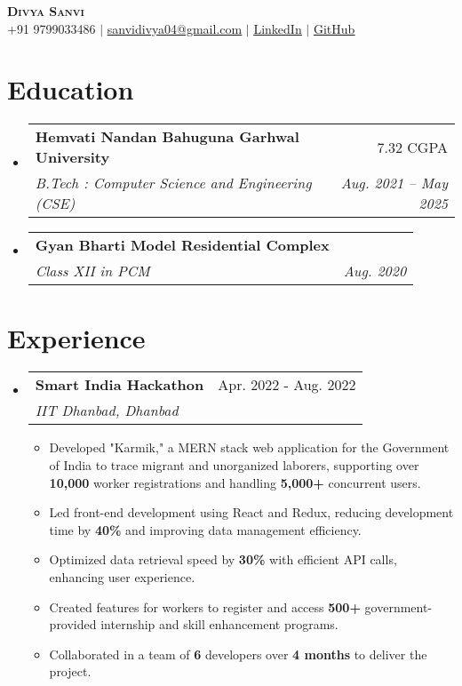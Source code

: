 \documentclass[letterpaper,10pt]{article}
\makeatletter
\newcommand{\resumeItem}[1]{\item\small{#1 \vspace{-2pt}}}
\newcommand{\resumeSubheading}[4]{\vspace{-2pt}\item\begin{tabular*}{0.98\textwidth}[t]{l@{\extracolsep{\fill}}r}\textbf{#1} & #2 \\ \textit{\small#3} & \textit{\small #4} \\ \end{tabular*}\vspace{-5pt}}
\newcommand{\resumeSubHeadingListStart}{\begin{itemize}[leftmargin=0.1in, label={}]}
\newcommand{\resumeSubHeadingListEnd}{\end{itemize}}
\newcommand{\resumeItemListStart}{\begin{itemize}}
\newcommand{\resumeItemListEnd}{\end{itemize}\vspace{-5pt}}
\makeatother
\begin{document}
\begin{center}
    {\Huge \scshape \textbf{Divya Sanvi}} \\ \vspace{4pt}
    \small +91 9799033486 $|$ \href{mailto:sanvidivya04@gmail.com}{\underline{sanvidivya04@gmail.com}} $|$ 
    \href{https://linkedin.com/in/divya-sanvi-ba8357262}{\underline{LinkedIn}} $|$ 
    \href{https://github.com/divyasanvi1}{ \hspace{0.2em} {\underline{GitHub}}}
\end{center}

\section{Education}
\resumeSubHeadingListStart
    \resumeSubheading
      {Hemvati Nandan Bahuguna Garhwal University}{7.32 CGPA}
      {B.Tech : Computer Science and Engineering (CSE)}{Aug. 2021 -- May 2025}
    \resumeSubheading
      {Gyan Bharti Model Residential Complex}{}
      {Class XII in PCM}{Aug. 2020}
\resumeSubHeadingListEnd

\section{Experience}
\resumeSubHeadingListStart
    \resumeSubheading
      {Smart India Hackathon }{Apr. 2022 - Aug. 2022}
      {IIT Dhanbad, Dhanbad}{}
      \resumeItemListStart
        \resumeItem{Developed "Karmik," a MERN stack web application for the Government of India to trace migrant and unorganized laborers, supporting over \textbf{10,000} worker registrations and handling \textbf{5,000+} concurrent users.}
        \resumeItem{Led front-end development using React and Redux, reducing development time by \textbf{40\%} and improving data management efficiency.}
        \resumeItem{Optimized data retrieval speed by \textbf{30\%} with efficient API calls, enhancing user experience.}
        \resumeItem{Created features for workers to register and access \textbf{500+} government-provided internship and skill enhancement programs.}
        \resumeItem{Collaborated in a team of \textbf{6} developers over \textbf{4 months} to deliver the project.}
      \resumeItemListEnd
\resumeSubHeadingListEnd

\end{document}
